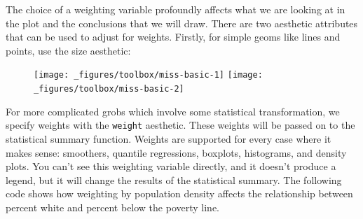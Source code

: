 The choice of a weighting variable profoundly affects what we are
looking at in the plot and the conclusions that we will draw. There are
two aesthetic attributes that can be used to adjust for weights.
Firstly, for simple geoms like lines and points, use the size aesthetic:

\begin{Shaded}
\begin{Highlighting}[]
\StringTok{ }
\StringTok{  }\NormalTok{()}

\StringTok{ }
\StringTok{  }\NormalTok{(}\NormalTok{(} \StringTok{ }\NormalTok{)) +}\StringTok{ }
\StringTok{  }\NormalTok{(}\NormalTok{, } \NormalTok{(}\NormalTok{, }\NormalTok{, }\NormalTok{, }\NormalTok{))}
\end{Highlighting}
\end{Shaded}

\begin{figure}[H]
  \texttt{[image: \_figures/toolbox/miss-basic-1]}%
  \texttt{[image: \_figures/toolbox/miss-basic-2]}
\end{figure}

For more complicated grobs which involve some statistical
transformation, we specify weights with the \texttt{weight} aesthetic.
These weights will be passed on to the statistical summary function.
Weights are supported for every case where it makes sense: smoothers,
quantile regressions, boxplots, histograms, and density plots. You can't
see this weighting variable directly, and it doesn't produce a legend,
but it will change the results of the statistical summary. The following
code shows how weighting by population density affects the relationship
between percent white and percent below the poverty line.


